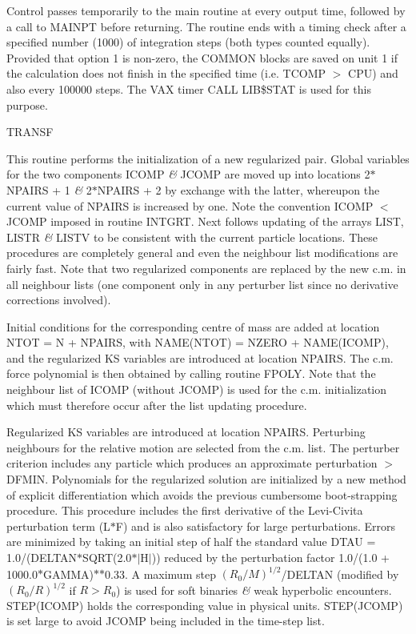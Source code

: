   Control passes temporarily to the main routine at every output time, followed
 by a call to MAINPT before returning.  The
 routine ends with a timing check after a specified number (1000) of integration
 steps (both types counted equally).  Provided that option 1 is non-zero, the
 COMMON blocks are saved on unit 1 if the calculation does not finish in
 the specified time (i.e. TCOMP $>$ CPU) and also every 100000 steps.  The
 VAX timer CALL LIB\$STAT is used for this purpose.
\bigskip
\bigskip
\centerline {TRANSF}
\bigskip

 This routine performs the initialization of a new regularized
 pair.  Global variables for the two components ICOMP {\it\&}
 JCOMP are moved up into locations
 2$\ast$NPAIRS + 1 {\it\&} 2$\ast$NPAIRS + 2 by exchange with the latter, 
 whereupon the current value of NPAIRS is increased by one.  Note the convention
 ICOMP $<$ JCOMP imposed in routine INTGRT.  Next follows updating of the
 arrays LIST, LISTR {\it\&} LISTV to be consistent with the
 current particle locations.  These
 procedures are completely general and even the neighbour list 
 modifications are fairly fast.  Note that two regularized components 
 are replaced by the new c.m. in all neighbour lists (one component
 only in any perturber list since no derivative corrections involved).

 Initial conditions for the corresponding centre of mass are added
 at location NTOT = N + NPAIRS, with NAME(NTOT) = NZERO + NAME(ICOMP), and the
 regularized KS variables are introduced at location NPAIRS.  The c.m. force
 polynomial is then obtained by calling routine FPOLY.  Note that the neighbour
 list of ICOMP (without JCOMP) is used for the c.m. initialization which must
 therefore occur after the list updating procedure.

 Regularized KS variables are introduced at location NPAIRS.  Perturbing
 neighbours for the relative motion are selected from the c.m. list.  The
 perturber criterion includes any particle which produces an approximate
 perturbation $>$ DFMIN.  Polynomials for the regularized solution are
 initialized by a
 new method of explicit differentiation which avoids the previous
 cumbersome boot-strapping procedure.  This procedure includes
 the first derivative of the Levi-Civita perturbation term (L$\ast$F) and
 is also satisfactory for large perturbations.  Errors are minimized by taking 
 an initial step of half the standard value
 DTAU = 1.0/(DELTAN$\ast$SQRT(2.0$\ast$$\vert$H$\vert$))
  reduced by the perturbation factor 1.0/(1.0 + 1000.0$\ast$GAMMA)$\ast$$\ast$0.33.  A
 maximum step $(R_0/M)^{1/2}$/DELTAN (modified by
 $(R_0/R)^{1/2}$ if $R > R_0$)
 is used for soft binaries {\it \&} weak hyperbolic 
 encounters.  STEP(ICOMP) holds the corresponding value in physical
 units.  STEP(JCOMP) is set large to avoid JCOMP being included in the
 time-step list.

